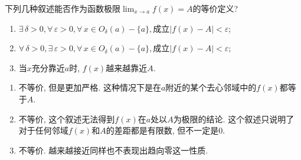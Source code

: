      \begin{exercise}
         下列几种叙述能否作为函数极限$\lim_{x\to a}f(x)=A$的等价定义?
         \begin{enumerate}
             \item $\exists\, \delta>0, \forall\, \varepsilon>0, \forall\, x \in O_\delta(a)-\{a\}, \text{成立}|f(x)-A|<\varepsilon$;
             \item $\forall\, \delta>0, \exists\, \varepsilon>0, \forall\, x \in O_\delta(a)-\{a\}, \text{成立}|f(x)-A|<\varepsilon$;
             \item 当$x$充分靠近$a$时, $f(x)$越来越靠近$A$.
         \end{enumerate}
     \end{exercise}
     \begin{solution}
         \begin{enumerate}
             \item 不等价, 但是更加严格. 这种情况下是在$a$附近的某个去心邻域中的$f(x)$都等于$A$.
             \item 不等价, 这个叙述无法得到$f(x)$在$a$处以$A$为极限的结论. 这个叙述只说明了对于任何邻域$f(x)$和$A$的差距都是有限数, 但不一定是0.
             \item 不等价. 越来越接近同样也不表现出趋向零这一性质.
         \end{enumerate}
     \end{solution}
